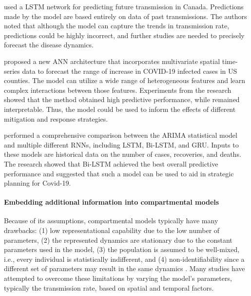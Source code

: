 \citeauthor{chimmulaTimeSeriesForecasting2020} \cite{chimmulaTimeSeriesForecasting2020} used a \gls{LSTM} network for predicting future transmission in Canada.
Predictions made by the model are based entirely on data of past transmissions.
The authors noted that although the model can capture the trends in transmission rate, predictions could be highly incorrect, and further studies are needed to precisely forecast the disease dynamics.

\citeauthor{ramchandaniDeepCOVIDNetInterpretableDeep2020} \cite{ramchandaniDeepCOVIDNetInterpretableDeep2020} proposed a new \gls{ANN} architecture that incorporates multivariate spatial time-series data to forecast the range of increase in COVID-19 infected cases in \gls{US} counties.
The model can utilize a wide range of heterogeneous features and learn complex interactions between those features.
Experiments from the research showed that the method obtained high predictive performance, while remained interpretable.
Thus, the model could be used to inform the effects of different mitigation and response strategies.

\citeauthor{shahidPredictionsCOVID19Deep2020} \cite{shahidPredictionsCOVID19Deep2020} performed a comprehensive comparison between the \gls{ARIMA} statistical model and multiple different \glspl{RNN}, including \gls{LSTM}, \gls{Bi-LSTM}, and \gls{GRU}.
Inputs to these models are historical data on the number of cases, recoveries, and deaths.
The research showed that \gls{Bi-LSTM} achieved the best overall predictive performance and suggested that such a model can be used to aid in strategic planning for Covid-19.

\paragraph{Embedding additional information into compartmental models}
Because of its assumptions, compartmental models typically have many drawbacks: (1) low representational capability due to the low number of parameters, (2) the represented dynamics are stationary due to the constant parameters used in the model, (3) the population is assumed to be well-mixed, i.e., every individual is statistically indifferent, and (4) non-identifiability since a different set of parameters may result in the same dynamics \cite{roosaAssessingParameterIdentifiability2019}.
Many studies have attempted to overcome these limitations by varying the model's parameters, typically the transmission rate, based on spatial and temporal factors.

